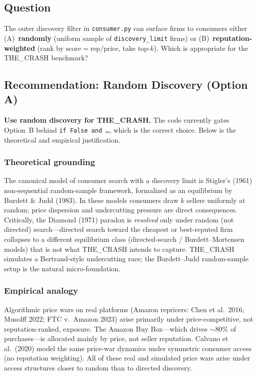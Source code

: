 \documentclass{article}
\begin{document}
\subsection{Question}

The outer discovery filter in \texttt{consumer.py} can surface firms to consumers either (A)~\textbf{randomly} (uniform sample of \texttt{discovery\_limit} firms) or (B)~\textbf{reputation-weighted} (rank by $\text{score} = \text{rep}/\text{price}$, take top-$k$). Which is appropriate for the THE\_CRASH benchmark?

\subsection{Recommendation: Random Discovery (Option A)}

\textbf{Use random discovery for THE\_CRASH.} The code currently gates Option~B behind \texttt{if False and \ldots}, which is the correct choice. Below is the theoretical and empirical justification.

\subsubsection{Theoretical grounding}

The canonical model of consumer search with a discovery limit is Stigler's (1961) non-sequential random-sample framework, formalized as an equilibrium by Burdett \& Judd (1983). In these models consumers draw $k$ sellers uniformly at random; price dispersion and undercutting pressure are direct consequences. Critically, the Diamond (1971) paradox is \emph{resolved} only under random (not directed) search---directed search toward the cheapest or best-reputed firm collapses to a different equilibrium class (directed-search / Burdett--Mortensen models) that is not what THE\_CRASH intends to capture. THE\_CRASH simulates a Bertrand-style undercutting race; the Burdett--Judd random-sample setup is the natural micro-foundation.

\subsubsection{Empirical analogy}

Algorithmic price wars on real platforms (Amazon repricers: Chen et al.\ 2016; Musolff 2022; FTC v.\ Amazon 2023) arise primarily under price-competitive, not reputation-ranked, exposure. The Amazon Buy Box---which drives $\sim$80\% of purchases---is allocated mainly by price, not seller reputation. Calvano et al.\ (2020) model the same price-war dynamics under symmetric consumer access (no reputation weighting). All of these real and simulated price wars arise under access structures closer to random than to directed discovery.
\end{document}
